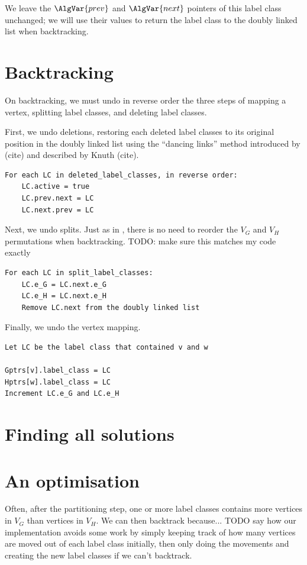 We leave the $\AlgVar{prev}$ and $\AlgVar{next}$ 
pointers of this label class unchanged; we will use their values to return
the label class to the doubly linked list when backtracking.

\section{Backtracking}

On backtracking, we must undo in reverse order the three steps of
mapping a vertex, splitting label classes, and deleting label classes.

First, we undo deletions, restoring each deleted label classes to its
original position in the doubly linked list using the ``dancing links'' method
introduced by (cite) and described by Knuth (cite).

{
\scriptsize
\begin{verbatim}
For each LC in deleted_label_classes, in reverse order:
    LC.active = true
    LC.prev.next = LC
    LC.next.prev = LC
\end{verbatim}
}

Next, we undo splits.  Just as in \McSplit, there is
no need to reorder the $V_G$ and $V_H$ permutations when backtracking.
TODO: make sure this matches my code exactly

{
\scriptsize
\begin{verbatim}
For each LC in split_label_classes:
    LC.e_G = LC.next.e_G
    LC.e_H = LC.next.e_H
    Remove LC.next from the doubly linked list
\end{verbatim}
}

Finally, we undo the vertex mapping.

{
\scriptsize
\begin{verbatim}
Let LC be the label class that contained v and w

Gptrs[v].label_class = LC
Hptrs[w].label_class = LC
Increment LC.e_G and LC.e_H
\end{verbatim}
}

\section{Finding all solutions}

\section{An optimisation}

Often, after the partitioning step, one or more label classes contains more
vertices in $V_G$ than vertices in $V_H$.  We can then backtrack because...
TODO say how our implementation avoids some work by simply keeping track of
how many vertices are moved out of each label class initially, then only
doing the movements and creating the new label classes if we can't backtrack.

